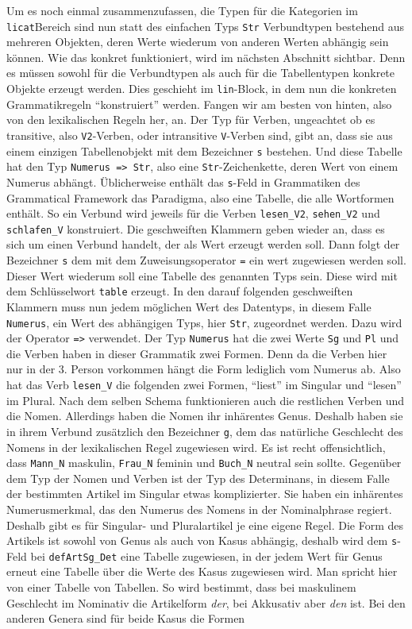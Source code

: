 Um es noch einmal zusammenzufassen, die Typen für die Kategorien im \texttt{licat}\-Bereich sind nun statt des einfachen Typs \texttt{Str} Verbundtypen bestehend aus mehreren Objekten, deren Werte wiederum von anderen Werten abhängig sein können. Wie das konkret funktioniert, wird im nächsten Abschnitt sichtbar. Denn es müssen sowohl für die Verbundtypen als auch für die Tabellentypen konkrete Objekte erzeugt werden. Dies geschieht im \texttt{lin}-Block, in dem nun die konkreten Grammatikregeln "`konstruiert"' werden. Fangen wir am besten von hinten, also von den lexikalischen Regeln her, an. Der Typ für Verben, ungeachtet ob es transitive, also \texttt{V2}-Verben, oder intransitive \texttt{V}-Verben sind, gibt an, dass sie aus einem einzigen Tabellenobjekt mit dem Bezeichner \texttt{s} bestehen. Und diese Tabelle hat den Typ \texttt{Numerus => Str}, also eine \texttt{Str}-Zeichenkette, deren Wert von einem Numerus abhängt. Üblicherweise enthält das \texttt{s}-Feld in Grammatiken des Grammatical Framework das Paradigma, also eine Tabelle, die alle Wortformen enthält. So ein Verbund wird jeweils für die Verben \texttt{lesen\_V2}, \texttt{sehen\_V2} und \texttt{schlafen\_V} konstruiert. Die geschweiften Klammern geben wieder an, dass es sich um einen Verbund handelt, der als Wert erzeugt werden soll. Dann folgt der Bezeichner \texttt{s} dem mit dem Zuweisungsoperator \texttt{=} ein wert zugewiesen werden soll. Dieser Wert wiederum soll eine Tabelle des genannten Typs sein. Diese wird mit dem Schlüsselwort \texttt{table} erzeugt. In den darauf folgenden geschweiften Klammern muss nun jedem möglichen Wert des Datentyps, in diesem Falle \texttt{Numerus}, ein Wert des abhängigen Typs, hier \texttt{Str}, zugeordnet werden. Dazu wird der Operator \texttt{=>} verwendet. Der Typ \texttt{Numerus} hat die zwei Werte \texttt{Sg} und \texttt{Pl} und die Verben haben in dieser Grammatik zwei Formen. Denn da die Verben hier nur in der 3. Person vorkommen hängt die Form lediglich vom Numerus ab. Also hat das Verb \texttt{lesen\_V} die folgenden zwei Formen, "`liest"' im Singular und "`lesen"' im Plural. Nach dem selben Schema funktionieren auch die restlichen Verben und die Nomen. Allerdings haben die Nomen ihr inhärentes Genus. Deshalb haben sie in ihrem Verbund zusätzlich den Bezeichner \texttt{g}, dem das natürliche Geschlecht des Nomens in der lexikalischen Regel zugewiesen wird. Es ist recht offensichtlich, dass \texttt{Mann\_N} maskulin, \texttt{Frau\_N} feminin und \texttt{Buch\_N} neutral sein sollte. Gegenüber dem Typ der Nomen und Verben ist der Typ des Determinans, in diesem Falle der bestimmten Artikel im Singular etwas komplizierter. Sie haben ein inhärentes Numerusmerkmal, das den Numerus des Nomens in der Nominalphrase regiert. Deshalb gibt es für Singular- und Pluralartikel je eine eigene Regel. Die Form des Artikels ist sowohl von Genus als auch von Kasus abhängig, deshalb wird dem  \texttt{s}-Feld bei \texttt{defArtSg\_Det} eine Tabelle zugewiesen, in der jedem Wert für Genus erneut eine Tabelle über die Werte des Kasus zugewiesen wird. Man spricht hier von einer Tabelle von Tabellen. So wird bestimmt, dass bei maskulinem Geschlecht im Nominativ die Artikelform \textit{der}, bei Akkusativ aber \textit{den} ist. Bei den anderen Genera sind für beide Kasus die Formen 